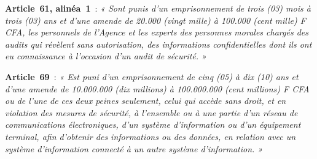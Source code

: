 \begin{boxjuris}
\medskip
\textbf{Article~61, alinéa~1}~: \textit{« Sont punis d'un emprisonnement de
trois (03) mois à trois (03) ans et d'une amende de 20.000 (vingt mille) à
100.000 (cent mille) F CFA, les personnels de l'Agence et les experts des
personnes morales chargés des audits qui révèlent sans autorisation, des
informations confidentielles dont ils ont eu connaissance à l'occasion d'un
audit de sécurité. »}

\medskip
\textbf{Article~69}~: \textit{« Est puni d'un emprisonnement de cinq (05) à
dix (10) ans et d'une amende de 10.000.000 (dix millions) à 100.000.000
(cent millions) F CFA ou de l'une de ces deux peines seulement, celui qui
accède sans droit, et en violation des mesures de sécurité, à l'ensemble ou
à une partie d'un réseau de communications électroniques, d'un système
d'information ou d'un équipement terminal, afin d'obtenir des informations
ou des données, en relation avec un système d'information connecté à un
autre système d'information. »}
\end{boxjuris}

